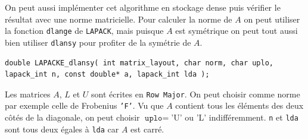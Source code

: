 \documentclass{article}
\begin{document}
On peut aussi implémenter cet algorithme en stockage dense puis vérifier le résultat avec une norme matricielle. Pour calculer la norme de $A$ on peut utiliser la fonction \texttt{dlange} de \texttt{LAPACK}, mais puisque $A$ est symétrique on peut tout aussi bien utiliser \texttt{dlansy} pour profiter de la symétrie de $A$.
\begin{scriptsize}
\begin{verbatim}
double LAPACKE_dlansy( int matrix_layout, char norm, char uplo, lapack_int n, const double* a, lapack_int lda );
\end{verbatim}
\end{scriptsize}
Les matrices $A$, $L$ et $U$ sont écrites en \texttt{Row Major}. On peut choisir comme norme par exemple celle de Frobenius \texttt{'F'}. Vu que $A$ contient tous les éléments des deux côtés de la diagonale, on peut choisir $\texttt{uplo} = $'U' ou 'L' indifféremment. \texttt{n} et \texttt{lda} sont tous deux égales à \texttt{lda} car $A$ est carré.
\end{document}
